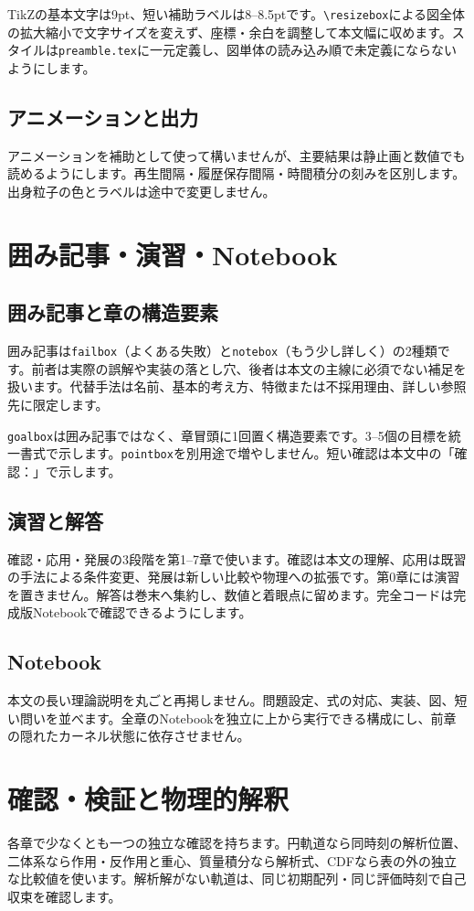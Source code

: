 \documentclass[10pt,openany]{book}
\begin{document}
TikZの基本文字は9pt、短い補助ラベルは8--8.5ptです。\verb|\resizebox|による図全体の拡大縮小で文字サイズを変えず、座標・余白を調整して本文幅に収めます。スタイルは\texttt{preamble.tex}に一元定義し、図単体の読み込み順で未定義にならないようにします。
\subsection{アニメーションと出力}
アニメーションを補助として使って構いませんが、主要結果は静止画と数値でも読めるようにします。再生間隔・履歴保存間隔・時間積分の刻みを区別します。出身粒子の色とラベルは途中で変更しません。

\section{囲み記事・演習・Notebook}
\subsection{囲み記事と章の構造要素}
囲み記事は\texttt{failbox}（よくある失敗）と\texttt{notebox}（もう少し詳しく）の2種類です。前者は実際の誤解や実装の落とし穴、後者は本文の主線に必須でない補足を扱います。代替手法は名前、基本的考え方、特徴または不採用理由、詳しい参照先に限定します。

\texttt{goalbox}は囲み記事ではなく、章冒頭に1回置く構造要素です。3--5個の目標を統一書式で示します。\texttt{pointbox}を別用途で増やしません。短い確認は本文中の「確認：」で示します。
\subsection{演習と解答}
確認・応用・発展の3段階を第1--7章で使います。確認は本文の理解、応用は既習の手法による条件変更、発展は新しい比較や物理への拡張です。第0章には演習を置きません。解答は巻末へ集約し、数値と着眼点に留めます。完全コードは完成版Notebookで確認できるようにします。
\subsection{Notebook}
本文の長い理論説明を丸ごと再掲しません。問題設定、式の対応、実装、図、短い問いを並べます。全章のNotebookを独立に上から実行できる構成にし、前章の隠れたカーネル状態に依存させません。


\section{確認・検証と物理的解釈}
各章で少なくとも一つの独立な確認を持ちます。円軌道なら同時刻の解析位置、二体系なら作用・反作用と重心、質量積分なら解析式、CDFなら表の外の独立な比較値を使います。解析解がない軌道は、同じ初期配列・同じ評価時刻で自己収束を確認します。
\end{document}
